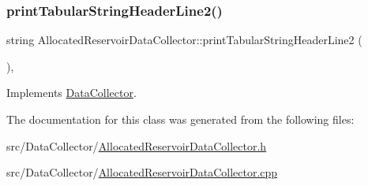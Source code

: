 \mbox{\label{classAllocatedReservoirDataCollector_a30d8c59205862822f6548472ba62e537}} 
\subsubsection{\texorpdfstring{print\+Tabular\+String\+Header\+Line2()}{printTabularStringHeaderLine2()}}
{\footnotesize\ttfamily string Allocated\+Reservoir\+Data\+Collector\+::print\+Tabular\+String\+Header\+Line2 (\begin{DoxyParamCaption}{ }\end{DoxyParamCaption})\hspace{0.3cm}{\ttfamily [override]}, {\ttfamily [virtual]}}



Implements \mbox{\hyperlink{classDataCollector_af01ea961314be2164f39e6d4cd59e443}{Data\+Collector}}.



The documentation for this class was generated from the following files\+:\begin{DoxyCompactItemize}
\item 
src/\+Data\+Collector/\mbox{\hyperlink{AllocatedReservoirDataCollector_8h}{Allocated\+Reservoir\+Data\+Collector.\+h}}\item 
src/\+Data\+Collector/\mbox{\hyperlink{AllocatedReservoirDataCollector_8cpp}{Allocated\+Reservoir\+Data\+Collector.\+cpp}}\end{DoxyCompactItemize}
